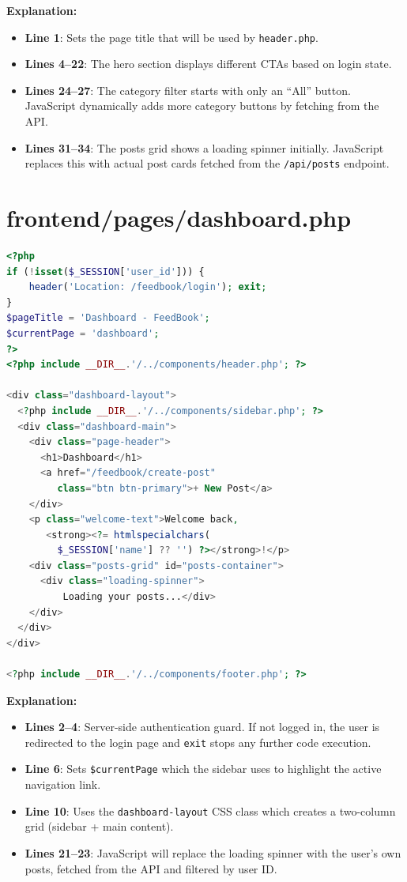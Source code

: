 \documentclass[12pt,a4paper]{report}
\begin{document}
\textbf{Explanation:}
\begin{itemize}
    \item \textbf{Line 1}: Sets the page title that will be used by \texttt{header.php}.
    \item \textbf{Lines 4--22}: The hero section displays different CTAs based on login state.
    \item \textbf{Lines 24--27}: The category filter starts with only an ``All'' button. JavaScript dynamically adds more category buttons by fetching from the API.
    \item \textbf{Lines 31--34}: The posts grid shows a loading spinner initially. JavaScript replaces this with actual post cards fetched from the \texttt{/api/posts} endpoint.
\end{itemize}

\section{frontend/pages/dashboard.php}

\begin{lstlisting}[language=PHP]
<?php
if (!isset($_SESSION['user_id'])) {
    header('Location: /feedbook/login'); exit;
}
$pageTitle = 'Dashboard - FeedBook';
$currentPage = 'dashboard';
?>
<?php include __DIR__.'/../components/header.php'; ?>

<div class="dashboard-layout">
  <?php include __DIR__.'/../components/sidebar.php'; ?>
  <div class="dashboard-main">
    <div class="page-header">
      <h1>Dashboard</h1>
      <a href="/feedbook/create-post"
         class="btn btn-primary">+ New Post</a>
    </div>
    <p class="welcome-text">Welcome back,
       <strong><?= htmlspecialchars(
         $_SESSION['name'] ?? '') ?></strong>!</p>
    <div class="posts-grid" id="posts-container">
      <div class="loading-spinner">
          Loading your posts...</div>
    </div>
  </div>
</div>

<?php include __DIR__.'/../components/footer.php'; ?>
\end{lstlisting}

\textbf{Explanation:}
\begin{itemize}
    \item \textbf{Lines 2--4}: Server-side authentication guard. If not logged in, the user is redirected to the login page and \texttt{exit} stops any further code execution.
    \item \textbf{Line 6}: Sets \texttt{\$currentPage} which the sidebar uses to highlight the active navigation link.
    \item \textbf{Line 10}: Uses the \texttt{dashboard-layout} CSS class which creates a two-column grid (sidebar + main content).
    \item \textbf{Lines 21--23}: JavaScript will replace the loading spinner with the user's own posts, fetched from the API and filtered by user ID.
\end{itemize}
\end{document}
